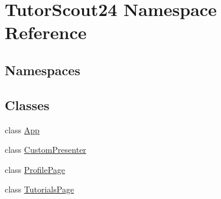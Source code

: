 \hypertarget{namespace_tutor_scout24}{}\section{Tutor\+Scout24 Namespace Reference}
\label{namespace_tutor_scout24}
\subsection*{Namespaces}
\begin{DoxyCompactItemize}
\end{DoxyCompactItemize}
\subsection*{Classes}
\begin{DoxyCompactItemize}
\item 
class \mbox{\hyperlink{class_tutor_scout24_1_1_app}{App}}
\item 
class \mbox{\hyperlink{class_tutor_scout24_1_1_custom_presenter}{Custom\+Presenter}}
\item 
class \mbox{\hyperlink{class_tutor_scout24_1_1_profile_page}{Profile\+Page}}
\item 
class \mbox{\hyperlink{class_tutor_scout24_1_1_tutorials_page}{Tutorials\+Page}}
\end{DoxyCompactItemize}
